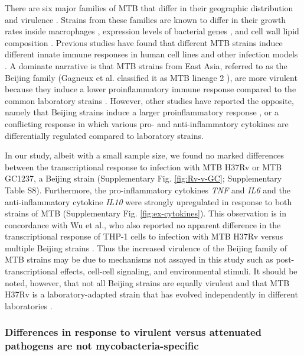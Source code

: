 There are six major families of MTB that differ in their geographic
distribution and virulence \citep{Gagneux2006, Comas2009}. Strains from
these families are known to differ in their growth rates inside
macrophages \citep{Li2002}, expression levels of bacterial genes
\citep{Homolka2010, Rose2013}, and cell wall lipid composition
\citep{Krishnan2011}. Previous studies have found that different MTB
strains induce different innate immune responses in human cell lines and
other infection models \citep{Coscolla2010}. A dominate narrative is that
MTB strains from East Asia, referred to as the Beijing family (Gagneux
et al. classified it as MTB lineage 2 \citep{Gagneux2006}), are more
virulent because they induce a lower proinflammatory immune response
compared to the common laboratory strains \citep{Manca2001, Manca2004,
Reed2004, Tanveer2009, Wang2010b}. However, other studies have
reported the opposite, namely that Beijing strains induce a larger
proinflammatory response \citep{Chacon-Salinas2005}, or a conflicting
response in which various pro- and anti-inflammatory cytokines are
differentially regulated \citep{Rocha-Ramirez2008, Koo2012} compared to
laboratory strains.

In our study, albeit with a small sample size, we found no marked
differences between the transcriptional response to infection with MTB
H37Rv or MTB GC1237, a Beijing strain (Supplementary Fig. \ref{fig:Rv-v-GC};
Supplementary Table S8). Furthermore, the pro-inflammatory cytokines
\emph{TNF} and \emph{IL6} and the anti-inflammatory cytokine \emph{IL10}
were strongly upregulated in response to both strains of MTB
(Supplementary Fig. \ref{fig:ex-cytokines}). This observation is in concordance with Wu et
al., who also reported no apparent difference in the transcriptional
response of THP-1 cells to infection with MTB H37Rv versus multiple
Beijing strains \citep{Wu2012}. Thus the increased virulence of the
Beijing family of MTB strains may be due to mechanisms not assayed in
this study such as post-transcriptional effects, cell-cell signaling,
and environmental stimuli. It should be noted, however, that not all
Beijing strains are equally virulent \citep{Dormans2004, Sinsimer2008}
and that MTB H37Rv is a laboratory-adapted strain that has evolved
independently in different laboratories \citep{Ioerger2010}.

\subsubsection{Differences in response to virulent versus attenuated
pathogens are not
mycobacteria-specific}\label{differences-in-response-to-virulent-versus-attenuated-pathogens-are-not-mycobacteria-specific}

